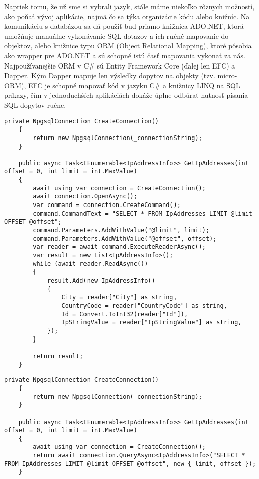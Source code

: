 Napriek tomu, že už sme si vybrali jazyk, stále máme niekoľko rôznych možností, ako poňať vývoj aplikácie, najmä čo sa týka organizácie kódu 
alebo knižníc. Na komunikáciu s databázou sa dá použiť buď priamo knižnica ADO.NET, ktorá umožňuje manuálne vykonávanie SQL dotazov a ich ručné 
mapovanie do objektov, alebo knižnice typu ORM (Object Relational Mapping), ktoré pôsobia ako wrapper pre ADO.NET a sú schopné istú časť mapovania 
vykonať za nás. Najpoužívanejšie ORM v C\# sú Entity Framework Core (ďalej len EFC) a Dapper. Kým Dapper mapuje len výsledky dopytov na objekty (tzv. micro-ORM), 
EFC je schopné mapovať kód v jazyku C\# a knižnicy LINQ na SQL príkazy, čím v jednoduchších aplikáciách dokáže úplne odbúrať nutnosť písania 
SQL dopytov ručne.

\begin{lstlisting}[float,language={[Sharp]C},caption={Ukážka kódu pre ten istý dopyt pomocou rôznych knižníc - ADO.NET},label=alg:Ukazka_ADO]
    private NpgsqlConnection CreateConnection()
    {
        return new NpgsqlConnection(_connectionString);
    }

    public async Task<IEnumerable<IpAddressInfo>> GetIpAddresses(int offset = 0, int limit = int.MaxValue)
    {
        await using var connection = CreateConnection();
        await connection.OpenAsync();
        var command = connection.CreateCommand();
        command.CommandText = "SELECT * FROM IpAddresses LIMIT @limit OFFSET @offset";
        command.Parameters.AddWithValue("@limit", limit);
        command.Parameters.AddWithValue("@offset", offset);
        var reader = await command.ExecuteReaderAsync();
        var result = new List<IpAddressInfo>();
        while (await reader.ReadAsync())
        {
            result.Add(new IpAddressInfo()
            {
                City = reader["City"] as string,
                CountryCode = reader["CountryCode"] as string,
                Id = Convert.ToInt32(reader["Id"]),
                IpStringValue = reader["IpStringValue"] as string,
            });
        }

        return result;
    }
\end{lstlisting}
\begin{lstlisting}[float,language={[Sharp]C},caption={Ukážka kódu pre ten istý dopyt pomocou rôznych knižníc - Dapper},label=alg:Ukazka_Dapper]
    private NpgsqlConnection CreateConnection()
    {
        return new NpgsqlConnection(_connectionString);
    }

    public async Task<IEnumerable<IpAddressInfo>> GetIpAddresses(int offset = 0, int limit = int.MaxValue)
    {
        await using var connection = CreateConnection();
        return await connection.QueryAsync<IpAddressInfo>("SELECT * FROM IpAddresses LIMIT @limit OFFSET @offset", new { limit, offset });
    }
\end{lstlisting}
